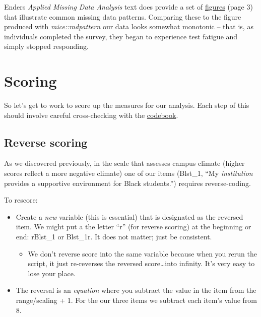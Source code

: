 \documentclass[
  11pt,
]{book}
\providecommand{\tightlist}{%
  \setlength{\itemsep}{0pt}\setlength{\parskip}{0pt}}
\begin{document}
Enders \citeyearpar{enders_applied_2010} \emph{Applied Missing Data Analysis} text does provide a set of \href{https://www.google.com/books/edition/Applied_Missing_Data_Analysis/uHt4EAAAQBAJ?hl=en\&gbpv=1\&dq=enders+missing+data\&pg=PP1\&printsec=frontcover}{figures} (page 3) that illustrate common missing data patterns. Comparing these to the figure produced with \emph{mice::mdpattern} our data looks somewhat monotonic -- that is, as individuals completed the survey, they began to experience test fatigue and simply stopped responding.

\hypertarget{scoring}{%
\section{Scoring}\label{scoring}}

So let's get to work to score up the measures for our analysis. Each step of this should involve careful cross-checking with the \href{https://github.com/lhbikos/ReC_MultivModel/blob/main/Rate_a_Course_Codebook.pdf}{codebook}.

\hypertarget{reverse-scoring}{%
\subsection{Reverse scoring}\label{reverse-scoring}}

As we discovered previously, in the scale that assesses campus climate (higher scores reflect a more negative climate) one of our items (Blst\_1, ``My \emph{institution} provides a supportive environment for Black students.'') requires reverse-coding.

To rescore:

\begin{itemize}
\tightlist
\item
  Create a \emph{new} variable (this is essential) that is designated as the reversed item. We might put a the letter ``r'' (for reverse scoring) at the beginning or end: rBlst\_1 or Blst\_1r. It does not matter; just be consistent.

  \begin{itemize}
  \tightlist
  \item
    We don't reverse score into the same variable because when you rerun the script, it just re-reverses the reversed score\ldots into infinity. It's very easy to lose your place.
  \end{itemize}
\item
  The reversal is an \emph{equation} where you subtract the value in the item from the range/scaling + 1. For the our three items we subtract each item's value from 8.
\end{itemize}
\end{document}
